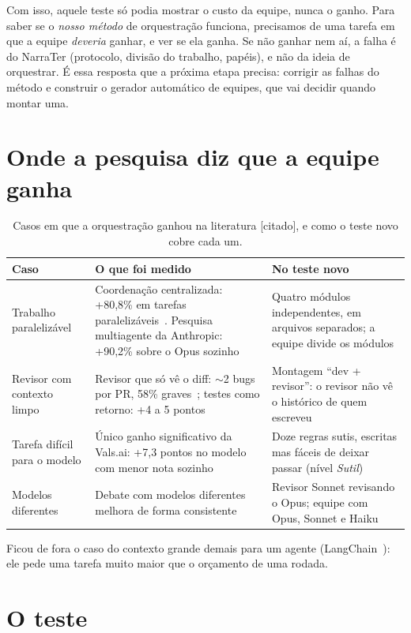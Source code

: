 \documentclass[11pt,a4paper]{article}
\newcommand{\rot}[1]{\textsf{\footnotesize[#1]}}
\begin{document}
Com isso, aquele teste só podia mostrar o custo da equipe, nunca o ganho. Para saber se o \emph{nosso
método} de orquestração funciona, precisamos de uma tarefa em que a equipe \emph{deveria} ganhar, e ver
se ela ganha. Se não ganhar nem aí, a falha é do NarraTer (protocolo, divisão do trabalho, papéis), e
não da ideia de orquestrar. É essa resposta que a próxima etapa precisa: corrigir as falhas do método e
construir o gerador automático de equipes, que vai decidir quando montar uma.

\section{Onde a pesquisa diz que a equipe ganha}

\begin{table}[H]
\centering\small
\caption{Casos em que a orquestração ganhou na literatura \rot{citado}, e como o teste novo cobre cada
um.}
\begin{tabularx}{\linewidth}{p{3.3cm}YY}
\toprule
Caso & O que foi medido & No teste novo \\
\midrule
Trabalho paralelizável & Coordenação centralizada: +80,8\% em tarefas paralelizáveis~\cite{kim2025}. Pesquisa
multiagente da Anthropic: +90,2\% sobre o Opus sozinho~\cite{anthropic2025} &
Quatro módulos independentes, em arquivos separados; a equipe divide os módulos \\
Revisor com contexto limpo & Revisor que só vê o diff: ${\sim}$2 bugs por PR, 58\% graves~\cite{cognition2026};
testes como retorno: +4 a 5 pontos~\cite{metagpt2023} &
Montagem ``dev + revisor'': o revisor não vê o histórico de quem escreveu \\
Tarefa difícil para o modelo & Único ganho significativo da Vals.ai: +7,3 pontos no modelo com menor nota
sozinho~\cite{vals2026} &
Doze regras sutis, escritas mas fáceis de deixar passar (nível \emph{Sutil}) \\
Modelos diferentes & Debate com modelos diferentes melhora de forma consistente~\cite{mad2025} &
Revisor Sonnet revisando o Opus; equipe com Opus, Sonnet e Haiku \\
\bottomrule
\end{tabularx}
\end{table}

Ficou de fora o caso do contexto grande demais para um agente (LangChain~\cite{langchain2025}): ele
pede uma tarefa muito maior que o orçamento de uma rodada.

\section{O teste}
\end{document}
